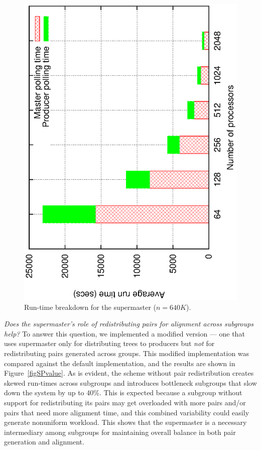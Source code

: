 \documentclass[10pt,journal,letterpaper,compsoc]{IEEEtran}
\begin{document}
\begin{figure}[thb]
\centerline{
						\includegraphics[angle=-90, scale=0.5]{spBreak.eps}
            }
\caption{
Run-time breakdown for the supermaster ($n=640K$).
}
\label{figSupermasterBreakdown}
\end{figure}


\emph{Does the supermaster's role of redistributing pairs for alignment across subgroups help?} To answer this question, we implemented a modified version --- one that uses supermaster only for distributing trees to producers but \emph{not} for redistributing pairs generated across groups. This modified implementation was compared against the default implementation, and the results are shown in Figure~\ref{figSPvalue}. As is evident, the scheme without pair redistribution creates skewed run-times across subgroups and introduces bottleneck subgroups that slow down the system by up to 40\%. This is expected because a subgroup without support for redistributing its pairs may get overloaded with more pairs and/or pairs that need more alignment time, and this combined variability could easily generate nonuniform workload. This shows that the supermaster is a necessary intermediary among subgroups for maintaining overall balance in both pair generation and alignment.
\end{document}
